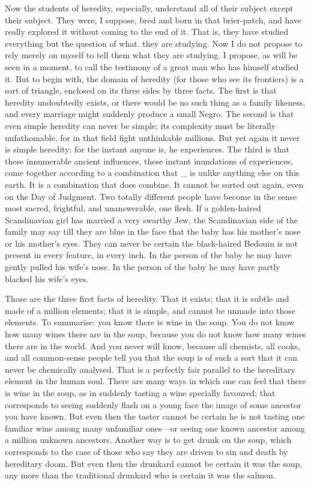 \documentclass{book}
\begin{document}
Now the students of heredity, especially, understand all of their subject except their subject. They were, I suppose, bred and born in that brier-patch, and have really explored it without coming to the end of it. That is, they have studied everything but the question of what. they are studying. Now I do not propose to rely merely on myself to tell them what they are studying. I propose, as will be seen in a moment, to call the testimony of a great man who has himself studied it. But to begin with, the domain of heredity (for those who see its frontiers) is a sort of triangle, enclosed on its three sides by three facts. The first is that heredity undoubtedly exists, or there would be no such thing as a family likeness, and every marriage might suddenly produce a small Negro. The second is that even simple heredity can never be simple; its complexity must be literally unfathomable, for in that field fight unthinkable millions. But yet again it never is simple heredity: for the instant anyone is, he experiences. The third is that these innumerable ancient influences, these instant inundations of experiences, come together according to a combination that \_ is unlike anything else on this earth. It is a combination that does combine. It cannot be sorted out again, even on the Day of Judgment. Two totally different people have become in the sense most sacred, frightful, and unanswerable, one flesh. If a golden-haired Scandinavian girl has married a very swarthy Jew, the Scandinavian side of the family may say till they are blue in the face that the baby has his mother’s nose or his mother’s eyes. They can never be certain the black-haired Bedouin is not present in every feature, in every inch. In the person of the baby he may have gently pulled his wife’s nose. In the person of the baby he may have partly blacked his wife’s eyes.

Those are the three first facts of heredity. That it exists; that it is subtle and made of a million elements; that it is simple, and cannot be unmade into those elements. To summarise: you know there is wine in the soup. You do not know how many wines there are in the soup, because you do not know how many wines there are in the world. And you never will know, because all chemists, all cooks, and all common-sense people tell you that the soup is of such a sort that it can never be chemically analysed. That is a perfectly fair parallel to the hereditary element in the human soul. There are many ways in which one can feel that there is wine in the soup, as in suddenly tasting a wine specially favoured; that corresponds to seeing suddenly flash on a young face the image of some ancestor you have known. But even then the taster cannot be certain he is not tasting one familiar wine among many unfamiliar ones—or seeing one known ancestor among a million unknown ancestors. Another way is to get drunk on the soup, which corresponds to the case of those who say they are driven to sin and death by hereditary doom. But even then the drunkard cannot be certain it was the soup, any more than the traditional drunkard who is certain it was the salmon.
\end{document}
